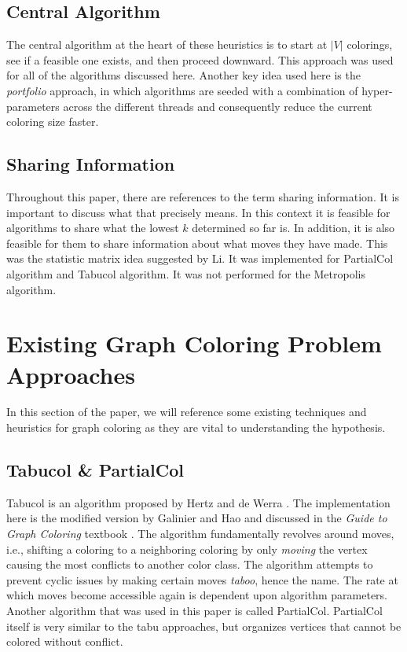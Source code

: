 \documentclass[runningheads]{llncs}
\begin{document}
\subsection{Central Algorithm}

The central algorithm at the heart of these heuristics is to start at $|V|$ colorings, see if a feasible one exists, and then proceed downward. This approach was used for all of the algorithms discussed here. Another key idea used here is the \emph{portfolio} approach, in which algorithms are seeded with a combination of hyper-parameters across the different threads and consequently reduce the current coloring size faster.

\subsection{Sharing Information}
Throughout this paper, there are references to the term sharing information. It is important to discuss what that precisely means. In this context it is feasible for algorithms to share what the lowest $k$ determined so far is. In addition, it is also feasible for them to share information about what moves they have made. This was the statistic matrix idea suggested by Li. \cite{https://doi.org/10.5445/ir/1000083192} It was implemented for PartialCol algorithm and Tabucol algorithm. It was not performed for the Metropolis algorithm.

\section{Existing Graph Coloring Problem Approaches }

In this section of the paper, we will reference some existing techniques and heuristics for graph coloring as they are vital to understanding the hypothesis.

\subsection{Tabucol \& PartialCol}\label{AA}
Tabucol is an algorithm proposed by Hertz and de Werra \cite{hdw}. The implementation here is the modified version by Galinier and Hao \cite{TabuCol} and discussed in the \emph{Guide to Graph Coloring} textbook \cite{10.5555/2851123}. The algorithm fundamentally revolves around moves, i.e., shifting a coloring to a neighboring coloring by only \emph{moving} the vertex causing the most conflicts to another color class. The algorithm attempts to prevent cyclic issues by making certain moves \emph{taboo}, hence the name. The rate at which moves become accessible again is dependent upon algorithm parameters. Another algorithm that was used in this paper is called PartialCol. PartialCol itself is very similar to the tabu approaches, but organizes vertices that cannot be colored without conflict.
\end{document}
